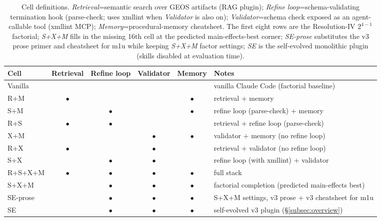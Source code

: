 \documentclass{article}
\begin{document}
\begin{table}[h]
  \caption{Cell definitions. \emph{Retrieval}=semantic search over GEOS artifacts (RAG plugin); \emph{Refine loop}=schema-validating termination hook (parse-check; uses xmllint when \emph{Validator} is also on); \emph{Validator}=schema check exposed as an agent-callable tool (xmllint MCP); \emph{Memory}=procedural-memory cheatsheet. The first eight rows are the Resolution-IV $2^{4-1}$ factorial; \emph{S+X+M} fills in the missing 16th cell at the predicted main-effects-best corner; \emph{SE-prose} substitutes the v3 prose primer and cheatsheet for m1u while keeping \emph{S+X+M} factor settings; \emph{SE} is the self-evolved monolithic plugin (skills disabled at evaluation time).}
  \label{tab:cells}
  \centering
  \small
  \begin{tabular}{lccccl}
    \toprule
    \textbf{Cell} & \textbf{Retrieval} & \textbf{Refine loop} & \textbf{Validator} & \textbf{Memory} & \textbf{Notes} \\
    \midrule
    Vanilla &         &         &         &         & vanilla Claude Code (factorial baseline)               \\
    R+M & $\bullet$ &         &         & $\bullet$ & retrieval + memory                                     \\
    S+M &         & $\bullet$ &         & $\bullet$ & refine loop (parse-check) + memory                     \\
    R+S & $\bullet$ & $\bullet$ &         &         & retrieval + refine loop (parse-check)                  \\
    X+M &         &         & $\bullet$ & $\bullet$ & validator + memory (no refine loop)                    \\
    R+X & $\bullet$ &         & $\bullet$ &         & retrieval + validator (no refine loop)                 \\
    S+X &         & $\bullet$ & $\bullet$ &         & refine loop (with xmllint) + validator                 \\
    R+S+X+M & $\bullet$ & $\bullet$ & $\bullet$ & $\bullet$ & full stack                                     \\
    \midrule
    S+X+M    &         & $\bullet$ & $\bullet$ & $\bullet$ & factorial completion (predicted main-effects best) \\
    SE-prose &         & $\bullet$ & $\bullet$ & $\bullet$ & S+X+M settings, v3 prose + v3 cheatsheet for m1u   \\
    SE       &         & $\bullet$ & $\bullet$ & $\bullet$ & self-evolved v3 plugin (\S\ref{subsec:overview})   \\
    \bottomrule
  \end{tabular}
\end{table}
\end{document}
